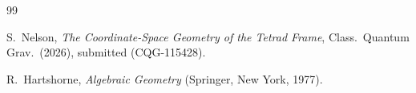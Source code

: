 \documentclass[twocolumn]{iopjournal}
\begin{document}

\begin{thebibliography}{99}

S.~Nelson,
\textit{The Coordinate-Space Geometry of the Tetrad Frame},
Class.\ Quantum Grav.\ (2026), submitted (CQG-115428).

R.~Hartshorne,
\textit{Algebraic Geometry}
(Springer, New York, 1977).

\end{thebibliography}
\end{document}
